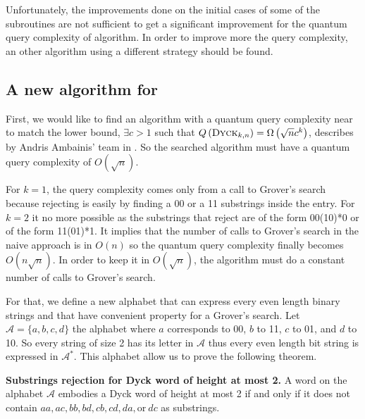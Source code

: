 Unfortunately, the improvements done on the initial cases of some of the subroutines are not sufficient
to get a significant improvement for the quantum query complexity of  algorithm. In order to
improve more the query complexity, an other algorithm using a different strategy should be found.

\subsection{A new algorithm for }

First, we would like to find an algorithm with a quantum query complexity near to match the lower bound,
$\exists c > 1$ such that $Q\left(\textsc{Dyck$_{k,n}$}\right)=\Omega\left(\sqrt{n}c^k\right)$, describes by Andris
Ambainis' team in \cite{art:2DGrid}. So the searched algorithm must have a quantum query
complexity of $O\left(\sqrt{n}\right)$.

For $k=1$, the query complexity comes only from a call to Grover's search
because rejecting is easily by finding a 00 or a 11 substrings inside the entry. For $k=2$
it no more possible as the substrings that reject are of the form 00(10)*0 or of the form 11(01)*1. It
implies that the number of calls to Grover's search in the naive approach is in $O\left(n\right)$ so the
quantum query complexity finally becomes $O\left(n\sqrt{n}\right)$. In order to keep it in
$O\left(\sqrt{n}\right)$, the algorithm must do a constant number of calls to Grover's search.

For that, we define a new alphabet that can express every even length binary
strings and that have convenient property for a Grover's search. Let
$\mathcal{A} = \{a, b, c, d\}$ the alphabet where $a$ corresponds to 00, $b$ to 11, $c$
to 01, and $d$ to 10. So every string of size 2 has its letter in $\mathcal{A}$ thus every
even length bit string is expressed in $\mathcal{A}^*$. This alphabet allow us to prove the
following theorem.

\begin{theorem}{\textbf{Substrings rejection for Dyck word of height at most 2.}}
    A word on the alphabet $\mathcal{A}$ embodies a Dyck word of
    height at most 2 if and only if it does not contain $aa, ac, bb, bd, cb, cd, da, \textrm{or}\ dc$
    as substrings.
\end{theorem}

